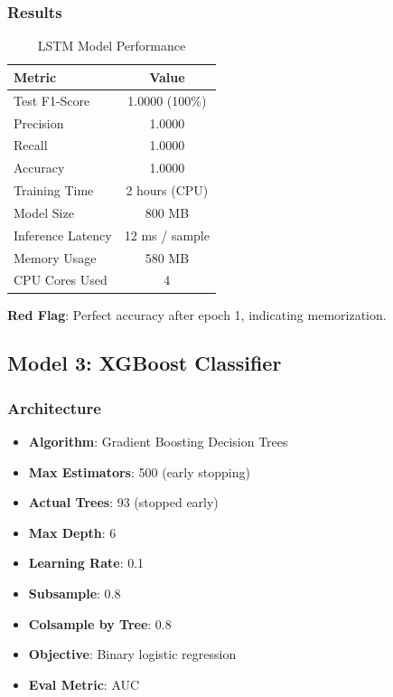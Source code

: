\documentclass[11pt,conference]{IEEEtran}
\begin{document}
\subsubsection{Results}

\begin{table}[h]
\centering
\caption{LSTM Model Performance}
\begin{tabular}{|l|c|}
\hline
\textbf{Metric} & \textbf{Value} \\
\hline
Test F1-Score & 1.0000 (100\%) \\
\hline
Precision & 1.0000 \\
\hline
Recall & 1.0000 \\
\hline
Accuracy & 1.0000 \\
\hline
Training Time & 2 hours (CPU) \\
\hline
Model Size & 800 MB \\
\hline
Inference Latency & 12 ms / sample \\
\hline
Memory Usage & 580 MB \\
\hline
CPU Cores Used & 4 \\
\hline
\end{tabular}
\end{table}

\textbf{Red Flag}: Perfect accuracy after epoch 1, indicating memorization.

\subsection{Model 3: XGBoost Classifier}

\subsubsection{Architecture}

\begin{itemize}
    \item \textbf{Algorithm}: Gradient Boosting Decision Trees
    \item \textbf{Max Estimators}: 500 (early stopping)
    \item \textbf{Actual Trees}: 93 (stopped early)
    \item \textbf{Max Depth}: 6
    \item \textbf{Learning Rate}: 0.1
    \item \textbf{Subsample}: 0.8
    \item \textbf{Colsample by Tree}: 0.8
    \item \textbf{Objective}: Binary logistic regression
    \item \textbf{Eval Metric}: AUC
\end{itemize}
\end{document}
